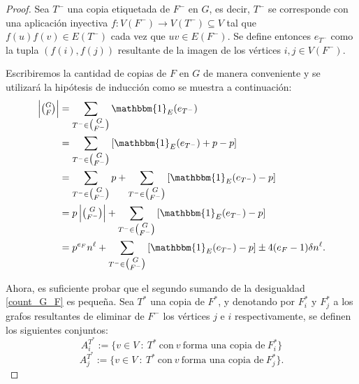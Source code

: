 \documentclass{article}[14pts]
\begin{document}
\begin{proof}
    Sea $T^{-}$ una copia etiquetada de $F^{-}$ en $G$, es decir, $T^{-}$ se corresponde con una aplicación inyectiva $f: V(F^{-}) \to V(T^{-})\subseteq V$ tal que $f(u)f(v)\in E(T^{-})$ cada vez que $uv\in E(F^{-})$. Se define entonces $e_{T^{-}}$ como la tupla $(f(i), f(j))$ resultante de la imagen de los vértices $i,j\in V(F^{-})$.

    Escribiremos la cantidad de copias de $F$ en $G$ de manera conveniente y se utilizará la hipótesis de inducción como se muestra a continuación:
    \begin{align} \label{count_G_F}
        \left| \tbinom{G}{F}\right| &= \sum_{T^{-}\in \tbinom{G}{F^{-}}} \mathbbm{1}_{E}(e_{T^{-}})\nonumber \\
        &= \sum_{T^{-}\in \tbinom{G}{F^{-}}} \left[ \mathbbm{1}_{E}(e_{T^{-}}) + p - p\right]\nonumber \\
        &= \sum_{T^{-}\in \tbinom{G}{F^{-}}} p + \sum_{T^{-}\in \tbinom{G}{F^{-}}} \left[ \mathbbm{1}_{E}(e_{T^{-}}) -p\right]\nonumber \\
        &= p\left|\tbinom{G}{F^{-}}\right| +  \sum_{T^{-}\in \tbinom{G}{F^{-}}} \left[ \mathbbm{1}_{E}(e_{T^{-}}) -p\right]\nonumber \\
        &= p^{e_F}n^{\ell} + \sum_{T^{-}\in \tbinom{G}{F^{-}}} \left[ \mathbbm{1}_{E}(e_{T^{-}}) -p\right] \pm 4(e_F - 1)\delta n^{\ell}.
    \end{align}
    
    Ahora, es suficiente probar que el segundo sumando de la desigualdad \eqref{count_G_F} es pequeña. Sea $T^{*}$ una copia de $F^{*}$, y denotando por $F_{i}^{*}$ y $F_{j}^{*}$ a los grafos resultantes de eliminar de $F^{-}$ los vértices $j$ e $i$ respectivamente, se definen los siguientes conjuntos:
    \[A_{i}^{T^{*}} := \lbrace v\in V\ :\ T^{*}\ \text{con}\ v\ \text{forma una copia de}\ F_{i}^{*}\rbrace \]
    \[A_{j}^{T^{*}} := \lbrace v\in V\ :\ T^{*}\ \text{con}\ v\ \text{forma una copia de}\ F_{j}^{*}\rbrace .\]


\end{proof}
\end{document}
